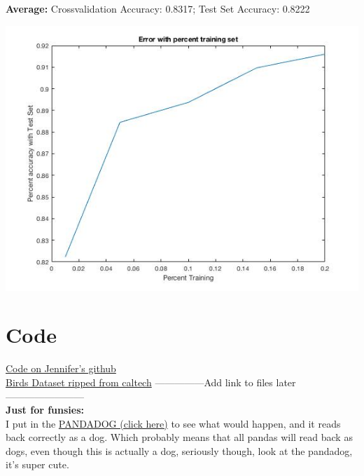 \documentclass{article}
\begin{document}
	\textbf{Average:} Crossvalidation Accuracy: 0.8317;  Test Set Accuracy: 0.8222

	\includegraphics[scale=0.35]{errorgraph} 

	\section{Code}
	\setlength\parindent{34pt} \href{https://github.com/jenncheung/Advance-Machine-Learning-Project}{Code on Jennifer's github} \\
	\href{http://www.vision.caltech.edu/visipedia/CUB-200-2011.html}{Birds Dataset ripped from caltech}
	 ---------------Add link to files later------------------------ \\
	\textbf{Just for funsies:} \\
	I put in the \href{http://guardianlv.com/wp-content/uploads/2014/05/The-Panda-Dog-Is-the-Newest-Rage-in-China.jpg}{PANDADOG (click here)} to see what would happen, and it reads back correctly as a dog.  Which probably means that all pandas will read back as dogs, even though this is actually a dog, seriously though, look at the pandadog, it's super cute.
\end{document}
